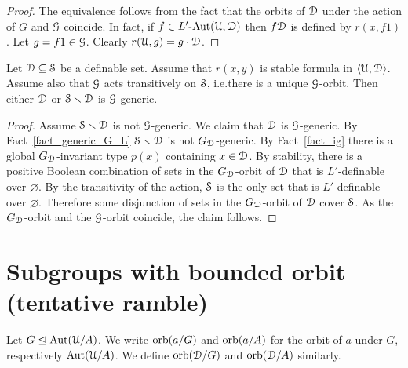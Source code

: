 \documentclass{amsproc}
\begin{document}
\begin{proof}
  The equivalence follows from the fact that the orbits of $\EuScript D$ under the action of $G$ and $\EuScript G$ coincide.
  In fact, if $f\in L'\mbox{-Aut}({\EuScript U},{\EuScript D})$ then $f{\EuScript D}$ is defined by $r(x,f1)$.
  Let $g=f1\in\EuScript G$.
  Clearly $r(\EuScript U,g)=g\cdot\EuScript D$.
\end{proof}

\begin{theorem}
  Let $\EuScript D\subseteq\EuScript S$ be a definable set.
  Assume that $r(x,y)$ is stable formula in $\langle\EuScript U,\EuScript D\rangle$.
  Assume also that $\EuScript G$ acts transitively on $\EuScript S$, i.e.\@ there is a unique $\EuScript G$-orbit.
  Then either $\EuScript D$ or $\EuScript S\smallsetminus\EuScript D$ is $\EuScript G$-generic.
\end{theorem}

\begin{proof}
  Assume $\EuScript S\smallsetminus\EuScript D$ is not $\EuScript G$-generic.
  We claim that $\EuScript D$ is $\EuScript G$-generic.
  By Fact~\ref{fact_generic_G_L} $\EuScript S\smallsetminus\EuScript D$ is not $G_{\EuScript D}$-generic.
  By Fact~\ref{fact_ig} there is a global $G_{\EuScript D}$-invariant type $p(x)$ containing $x\in\EuScript D$.
  By stability, there is a positive Boolean combination of sets in the $G_{\EuScript D}$-orbit of $\EuScript D$ that is $L'$-definable over $\varnothing$.
  By the transitivity of the action, $\EuScript S$ is the only set that is $L'$-definable over $\varnothing$.
  Therefore some disjunction of sets in the $G_{\EuScript D}$-orbit of $\EuScript D$ cover $\EuScript S$.
  As the $G_{\EuScript D}$-orbit and the $\EuScript G$-orbit coincide, the claim follows.
\end{proof}
  
\section{Subgroups with bounded orbit (tentative ramble)}

Let $G\trianglelefteq{\rm Aut}(\EuScript U/A)$.
We write ${\rm orb}(a/G)$ and ${\rm orb}(a/A)$ for the orbit of $a$ under $G$, respectively ${\rm Aut}(\EuScript U/A)$.
We define ${\rm orb}({\EuScript D}/G)$ and ${\rm orb}({\EuScript D}/A)$ similarly.
\end{document}
